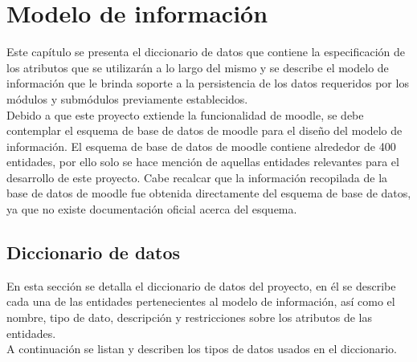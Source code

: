 \section{Modelo de información}
\label{ch:dominioDatos}

 Este capítulo se presenta el diccionario de datos que contiene la especificación de los
 atributos que se utilizarán a lo largo del mismo y se describe el modelo
 de información que le brinda soporte a la persistencia de los datos requeridos
 por los módulos y submódulos previamente establecidos.\\

 \noindent Debido a que este proyecto extiende la funcionalidad de moodle,
 se debe contemplar el esquema de base de datos de moodle para el diseño del modelo de información.
 El esquema de base de datos de moodle contiene alrededor de 400 entidades, por ello solo se hace mención de aquellas
 entidades relevantes para el desarrollo de este proyecto. Cabe recalcar que la información
 recopilada de la base de datos de moodle fue obtenida
 directamente del esquema de base de datos, ya que no existe documentación oficial acerca
 del esquema.

\subsection{Diccionario de datos}

 En esta sección se detalla el diccionario de datos del proyecto, en él se describe cada una
 de las entidades pertenecientes al modelo de información, así como el nombre, tipo de dato,
 descripción y restricciones sobre los atributos de las entidades.\\

 A continuación se listan y describen los tipos de
 datos usados en el diccionario.

